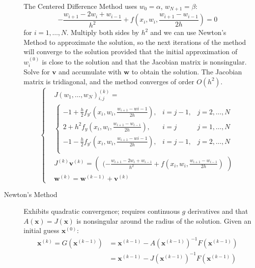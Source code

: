 \documentclass[8pt]{article}
\begin{document}
\begin{multicols}{2}
\begin{description}
\begin{itemize}
    \end{itemize}
    The Centered Difference Method uses $w_0 = \alpha$, $w_{N+1} =
    \beta$:
    $$-\frac{w_{i+1}-2w_i+w_{i-1}}{h^2} +
    f\left(x_i,w_i,\frac{w_{i+1}-w_{i-1}}{2h}\right) = 0$$
    for $i=1,\ldots,N$.  Multiply both sides by $h^2$ and we can use
    Newton's Method to approximate the solution, so the next
    iterations of the method will converge to the solution provided
    that the initial approximation of $w_i^{(0)}$ is close to the
    solution and that the Jacobian matrix is nonsingular. Solve for
    $\mathbf{v}$ and accumulate with $\mathbf{w}$ to obtain the
    solution. The Jacobian matrix is tridiagonal, and the method
    converges of order $O(h^2)$.
    \begin{equation*}
      \left\{
        \begin{aligned}
          &J(w_1,\ldots,w_N)_{i,j}^{(k)}= \\
          & \left\{
            \begin{array}{ccc}
              -1+\frac{h}{2}f_{y'}\left(x_i,w_i,\frac{w_{i+1}-w{i-1}}{2h}\right), & i=j-1, & j=2,\ldots,N \\
              2+h^2f_y\left(x_i,w_i,\frac{w_{i+1}-w_{i-1}}{2h}\right), & i=j & j=1,\ldots,N \\
              -1-\frac{h}{2}f_{y'}\left(x_i,w_i,\frac{w_{i+1}-w{i-1}}{2h}\right), & i=j-1, & j=2,\ldots,N \\
            \end{array}
          \right.\\
          &J^{(k)}\mathbf{v}^{(k)} = \begin{pmatrix} (-\frac{w_{i+1}-2w_i+w_{i-1}}{h^2} +
            f\left(x_i,w_i,\frac{w_{i+1}-w_{i-1}}{2h}\right) \end{pmatrix}\\
          &\mathbf{w}^{(k)} = \mathbf{w}^{(k-1)} + \mathbf{v}^{(k)}
        \end{aligned}
      \right.
    \end{equation*}
  \item[Newton's Method] Exhibits quadratic convergence; requires
    continuous $g$ derivatives and that $A(\mathbf{x}) =
    J(\mathbf{x})$ is nonsingular around the radius of the
    solution.  Given an initial guess $\mathbf{x}^{(0)}$:
    \begin{align*}
      \mathbf{x}^{(k)}=G(\mathbf{x}^{(k-1)})&=\mathbf{x}^{(k-1)}-A(\mathbf{x}^{(k-1)})^{-1}F(\mathbf{x}^{(k-1)}) \\
      &=\mathbf{x}^{(k-1)}-J(\mathbf{x}^{(k-1)})^{-1}F(\mathbf{x}^{(k-1)}) \\

\end{align*}
\end{description}
\end{multicols}
\end{document}
